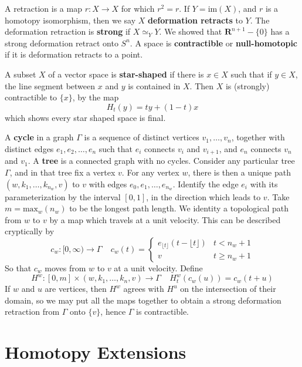 A retraction is a map $r:X \to X$ for which $r^2 = r$. If $Y = \text{im}(X)$, and $r$ is a homotopy isomorphism, then we say $X$ {\bf deformation retracts} to $Y$. The deformation retraction is {\bf strong} if $X \simeq_Y Y$. We showed that $\mathbf{R}^{n+1} - \{ 0 \}$ has a strong deformation retract onto $S^n$. A space is {\bf contractible} or {\bf null-homotopic} if it is deformation retracts to a point.

\begin{example}
    A subset $X$ of a vector space is {\bf star-shaped} if there is $x \in X$ such that if $y \in X$, the line segment between $x$ and $y$ is contained in $X$. Then $X$ is (strongly) contractible to $\{ x \}$, by the map
    \[ H_t(y) = ty + (1 - t)x \]
    which shows every star shaped space is final.
\end{example}

\begin{example}
    A {\bf cycle} in a graph $\Gamma$ is a sequence of distinct vertices $v_1, \dots, v_n$, together with distinct edges $e_1, e_2, \dots, e_n$ such that $e_i$ connects $v_i$ and $v_{i+1}$, and $e_n$ connects $v_n$ and $v_1$. A {\bf tree} is a connected graph with no cycles. Consider any particular tree $\Gamma$, and in that tree fix a vertex $v$. For any vertex $w$, there is then a unique path $(w, k_1, \dots, k_{n_w}, v)$ to $v$ with edges $e_0, e_1, \dots, e_{n_w}$. Identify the edge $e_i$ with its parameterization by the interval $[0,1]$, in the direction which leads to $v$. Take $m = \text{max}_w(n_w)$ to be the longest path length. We identity a topological path from $w$ to $v$ by a map which travels at a unit velocity. This can be described cryptically by
    \[ c_w:[0,\infty) \to \Gamma\ \ \ \ \ c_w(t) = \begin{cases} e_{\lfloor t \rfloor}(t - \lfloor t \rfloor) & t < n_w + 1 \\ v & t \geq n_w + 1 \end{cases} \]
    So that $c_w$ moves from $w$ to $v$ at a unit velocity. Define
    \[ H^w: [0,m] \times (w, k_1, \dots, k_n, v) \to \Gamma\ \ \ \ \ H^w_t(c_w(u)) = c_w(t + u) \]
    If $w$ and $u$ are vertices, then $H^w$ agrees with $H^u$ on the intersection of their domain, so we may put all the maps together to obtain a strong deformation retraction from $\Gamma$ onto $\{ v \}$, hence $\Gamma$ is contractible.
\end{example}


\section{Homotopy Extensions}

